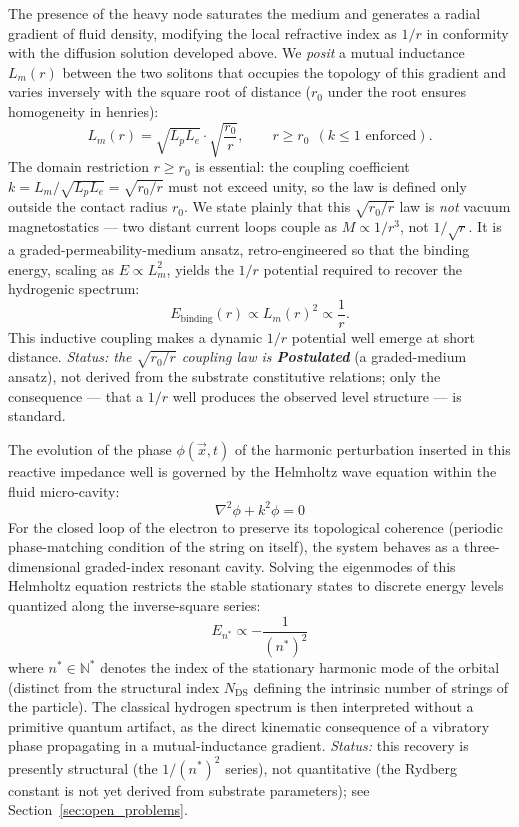 \documentclass[11pt,a4paper]{article}
\theoremstyle{plain}
\theoremstyle{remark}
\newcommand{\Ncd}{\ensuremath{N_{\mathrm{DS}}}}
\begin{document}
The presence of the heavy node saturates the medium and generates a radial gradient of fluid density, modifying the local refractive index as $1/r$ in conformity with the diffusion solution developed above. We \emph{posit} a mutual inductance $L_m(r)$ between the two solitons that occupies the topology of this gradient and varies inversely with the square root of distance ($r_0$ under the root ensures homogeneity in henries):
\begin{equation}\label{eq:mutual_inductance}
L_m(r) = \sqrt{L_p L_e} \cdot \sqrt{\frac{r_0}{r}}, \qquad r \ge r_0 \ \ (k \le 1 \text{ enforced}).
\end{equation}
The domain restriction $r \ge r_0$ is essential: the coupling coefficient $k = L_m/\sqrt{L_pL_e} = \sqrt{r_0/r}$ must not exceed unity, so the law is defined only outside the contact radius $r_0$. We state plainly that this $\sqrt{r_0/r}$ law is \emph{not} vacuum magnetostatics --- two distant current loops couple as $M \propto 1/r^3$, not $1/\sqrt r$. It is a graded-permeability-medium ansatz, retro-engineered so that the binding energy, scaling as $E \propto L_m^2$, yields the $1/r$ potential required to recover the hydrogenic spectrum:
\begin{equation}
E_{\text{binding}}(r) \propto L_m(r)^2 \propto \frac{1}{r}.
\end{equation}
This inductive coupling makes a dynamic $1/r$ potential well emerge at short distance. \emph{Status: the $\sqrt{r_0/r}$ coupling law is \textbf{Postulated}} (a graded-medium ansatz), not derived from the substrate constitutive relations; only the consequence --- that a $1/r$ well produces the observed level structure --- is standard.

The evolution of the phase $\phi(\vec{x},t)$ of the harmonic perturbation inserted in this reactive impedance well is governed by the Helmholtz wave equation within the fluid micro-cavity:
\begin{equation}
\nabla^2 \phi + k^2 \phi = 0
\end{equation}
For the closed loop of the electron to preserve its topological coherence (periodic phase-matching condition of the string on itself), the system behaves as a three-dimensional graded-index resonant cavity. Solving the eigenmodes of this Helmholtz equation restricts the stable stationary states to discrete energy levels quantized along the inverse-square series:
\begin{equation}
E_{n^*} \propto - \frac{1}{(n^*)^2}
\end{equation}
where $n^* \in \mathbb{N}^*$ denotes the index of the stationary harmonic mode of the orbital (distinct from the structural index $\Ncd$ defining the intrinsic number of strings of the particle). The classical hydrogen spectrum is then interpreted without a primitive quantum artifact, as the direct kinematic consequence of a vibratory phase propagating in a mutual-inductance gradient. \emph{Status:} this recovery is presently structural (the $1/(n^*)^2$ series), not quantitative (the Rydberg constant is not yet derived from substrate parameters); see Section~\ref{sec:open_problems}.
\end{document}
